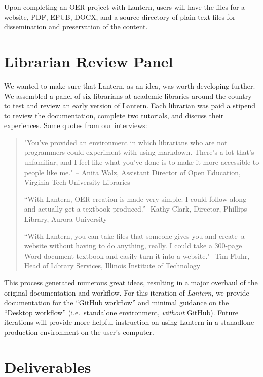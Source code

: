 \documentclass[
  11pt,
  openany]{book}
\begin{document}
Upon completing an OER project with Lantern, users will have the files for a
website, PDF, EPUB, DOCX, and a source directory of plain text files for
dissemination and preservation of the content.

\hypertarget{librarian-review-panel}{%
\section{Librarian Review Panel}\label{librarian-review-panel}}

We wanted to make sure that Lantern, as an idea, was worth developing further.
We assembled a panel of six librarians at academic libraries around the
country to test and review an early version of Lantern. Each librarian was
paid a stipend to review the documentation, complete two tutorials, and
discuss their experiences. Some quotes from our interviews:

\begin{quote}
"You've provided an environment in which librarians who are not programmers
could experiment with using markdown. There's a lot that's unfamiliar, and I
feel like what you've done is to make it more accessible to people like me."
-- Anita Walz, Assistant Director of Open Education, Virginia Tech University
Libraries

``With Lantern, OER creation is made very simple. I could follow along and
actually get a textbook produced.'' -Kathy Clark, Director, Phillips Library,
Aurora University

``With Lantern, you can take files that someone gives you and create~a website
without having to do anything, really. I could take a 300-page Word document
textbook and easily turn it into a website." -Tim Fluhr, Head of Library
Services, Illinois Institute of Technology
\end{quote}

This process generated numerous great ideas, resulting in a major overhaul of
the original documentation and workflow. For this iteration of \emph{Lantern},
we provide documentation for the ``GitHub workflow'' and minimal guidance on
the ``Desktop workflow'' (i.e.~standalone environment, \emph{without} GitHub).
Future iterations will provide more helpful instruction on using Lantern in a
stanadlone production environment on the user's computer.

\hypertarget{deliverables}{%
\section{Deliverables}\label{deliverables}}
\end{document}
